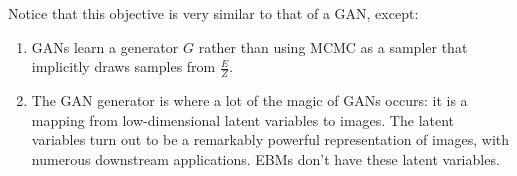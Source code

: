 Notice that this objective is very similar to that of a GAN, except:
\begin{enumerate}
    \item GANs learn a generator $G$ rather than using MCMC as a sampler that implicitly draws samples from $\frac{E}{Z}$.
    \item The GAN generator is where a lot of the magic of GANs occurs: it is a mapping from low-dimensional latent variables to images. The latent variables turn out to be a remarkably powerful representation of images, with numerous downstream applications. EBMs don't have these latent variables.
\end{enumerate}

